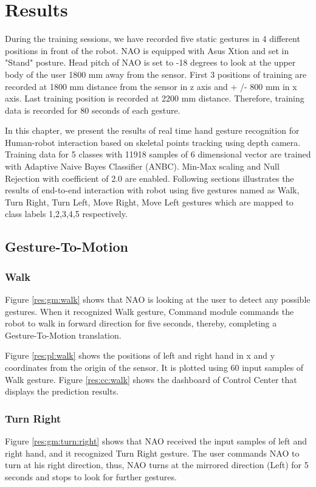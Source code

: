 \chapter{Results} \label{ch:result} During the training sessions, we have recorded five static gestures in 4 different positions in front of the robot. NAO is equipped with Asus Xtion and set in "Stand" posture. Head pitch of NAO is set to -18 degrees to look at the upper body of the user 1800 mm away from the sensor. First 3 positions of training are recorded at 1800 mm distance from the sensor in z axis and + /- 800 mm in x axis. Last training position is recorded at 2200 mm distance. Therefore, training data is recorded for 80 seconds of each gesture.

In this chapter, we present the results of real time hand gesture recognition for Human-robot interaction based on skeletal points tracking using depth camera. Training data for 5 classes with 11918 samples of 6 dimensional vector are trained with Adaptive Naive Bayes Classifier (ANBC). Min-Max scaling and Null Rejection with coefficient of 2.0 are enabled. Following sections illustrates the results of end-to-end interaction with robot using five gestures named as Walk, Turn Right, Turn Left, Move Right, Move Left gestures which are mapped to class labels 1,2,3,4,5 respectively.

\clearpage 
\section{Gesture-To-Motion} 
\subsection{Walk} Figure \ref{res:gm:walk} shows that NAO is looking at the user to detect any possible gestures. When it recognized Walk gesture, Command module commands the robot to walk in forward direction for five seconds, thereby, completing a Gesture-To-Motion translation.



Figure \ref{res:pl:walk} shows the positions of left and right hand in x and y coordinates from the origin of the sensor. It is plotted using 60 input samples of Walk gesture. Figure \ref{res:cc:walk} shows the dashboard of Control Center that displays the prediction results. 

\clearpage 
\subsection{Turn Right} Figure \ref{res:gm:turn:right} shows that NAO received the input samples of left and right hand, and it recognized Turn Right gesture. The user commands NAO to turn at his right direction, thus, NAO turns at the mirrored direction (Left) for 5 seconds and stops to look for further gestures.

